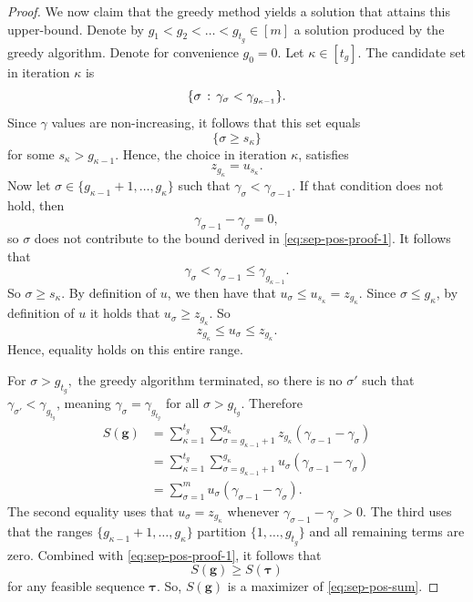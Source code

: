 \begin{proof}
    We now claim that the greedy method yields a solution that attains this upper-bound.
    Denote by $g_1 < g_2 < \dots < g_{t_g} \in [m]$ a solution produced by the greedy algorithm.
    Denote for convenience $g_0 = 0.$
    Let $\kappa \in [t_g].$ The candidate set in iteration $\kappa$ is
    \[
        \{\sigma \,:\, \gamma_{\sigma} < \gamma_{g_{\kappa-1}}\}.
    \]
    Since $\gamma$ values are non-increasing, it follows that this set equals
    \[
        \{\sigma \geq s_\kappa\}
    \]
    for some $s_\kappa > g_{\kappa-1}$.
    Hence, the choice in iteration $\kappa$, satisfies
    \[
        z_{g_\kappa} = u_{s_\kappa}.
    \]
    Now let $\sigma \in \{g_{\kappa-1} + 1, \dots, g_\kappa\}$ such that $\gamma_{\sigma} < \gamma_{\sigma-1} $.
    If that condition does not hold, then
    \[
        \gamma_{\sigma - 1} - \gamma_{\sigma} = 0,
    \]
    so $\sigma$ does not contribute to the bound derived in \eqref{eq:sep-pos-proof-1}.
    It follows that \[
                        \gamma_{\sigma} < \gamma_{\sigma-1} \leq \gamma_{g_{\kappa-1}}.
    \]
    So $\sigma \geq s_\kappa$.
    By definition of $u$, we then have that $u_{\sigma} \leq u_{s_\kappa} = z_{g_\kappa}.$
    Since $\sigma \leq g_\kappa$, by definition of $u$ it holds that $u_\sigma \geq z_{g_\kappa}.$
    So \[
           z_{g_\kappa} \leq u_{\sigma} \leq z_{g_\kappa}.
    \]
    Hence, equality holds on this entire range.

    For $\sigma > g_{t_g}, $ the greedy algorithm terminated, so there is no $\sigma'$ such that $\gamma_{\sigma'} < \gamma_{g_{t_g}}$,
    meaning $\gamma_\sigma = \gamma_{g_{t_g}}$ for all $\sigma > g_{t_g}$.
    Therefore
    \begin{equation}\label{eq:sep-pos-proof-2}
        \begin{split}
            S(\bm{g})
            & = \sum_{\kappa = 1}^{t_g} \sum_{\sigma = g_{\kappa-1}+1}^{g_\kappa}
                z_{g_\kappa}(\gamma_{\sigma-1} - \gamma_\sigma) \\
            & = \sum_{\kappa = 1}^{t_g} \sum_{\sigma = g_{\kappa-1}+1}^{g_\kappa}
                u_{\sigma}(\gamma_{\sigma-1} - \gamma_\sigma) \\
            & = \sum_{\sigma = 1}^m u_{\sigma}(\gamma_{\sigma-1} - \gamma_\sigma).
        \end{split}
    \end{equation}
    The second equality uses that $u_\sigma = z_{g_\kappa}$ whenever
    $\gamma_{\sigma-1} - \gamma_\sigma > 0$.
    The third uses that the ranges
    $\{g_{\kappa-1}+1, \dots, g_\kappa\}$ partition $\{1, \dots, g_{t_g}\}$
    and all remaining terms are zero.
    Combined with \eqref{eq:sep-pos-proof-1}, it follows that
    \[S(\bm{g}) \geq S(\bm{\tau})\]
    for any feasible sequence $\bm{\tau}$.
    So, $S(\bm{g})$ is a maximizer of \eqref{eq:sep-pos-sum}.
\end{proof}